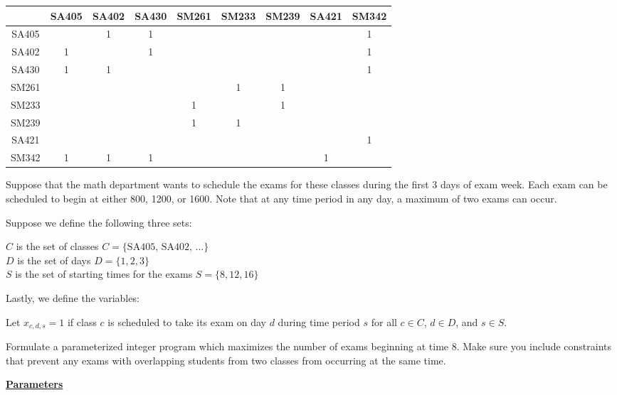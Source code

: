 \documentclass[letterpaper,oneside,12pt]{article}%
\newcommand{\blu}{\color{blue}}
\begin{document}
\begin{enumerate}
\begin{center}\begin{tabular}{|c|cccccccc|}\hline
      & SA405 & SA402 & SA430 & SM261 & SM233 & SM239 & SA421 & SM342 \\ \hline
SA405 &       & 1     & 1     &       &       &       &       & 1      \\
SA402 & 1     &       & 1     &       &       &       &       & 1     \\
SA430 & 1     & 1     &       &       &       &       &       & 1     \\
SM261 &       &       &       &       & 1     &  1    &       &       \\
SM233 &       &       &       & 1     &       &  1    &       &       \\
SM239 &       &       &       & 1     & 1     &       &       &       \\
SA421 &       &       &       &       &       &       &       & 1     \\
SM342 & 1     &  1    & 1     &       &       &       &  1    &       \\ \hline
\end{tabular}\end{center}

Suppose that the math department wants to schedule the exams for these classes during the first 3 days of exam week. Each exam can be scheduled to begin at either 800, 1200, or 1600. Note that at any time period in any day, a maximum of two exams can occur.

Suppose we define the following three sets:

$C$ is the set of classes $C = \{\text{SA405, SA402, ...}\}$ \\
$D$ is the set of days $D = \{1,2,3\}$ \\
$S$ is the set of starting times for the exams $S = \{8,12,16\}$

Lastly, we define the variables:

Let $x_{c,d,s} = 1$ if class $c$ is scheduled to take its exam on day $d$ during time period $s$ for all $c \in C$, $d \in D$, and $s \in S$.

Formulate a parameterized integer program which maximizes the number of exams beginning at time 8. Make sure you include constraints that prevent any exams with overlapping students from two classes from occurring at the same time.

{\blu

\textbf{\underline{Parameters}}

}
\end{enumerate}
\end{document}
